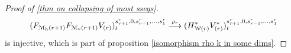 \documentclass[11pt]{amsart}
\theoremstyle{plain}
\theoremstyle{definition}
\renewcommand{\to}{\longrightarrow}
\newcommand{\calV}{\mathcal{V}}
\newcommand{\calM}{\mathcal{M}}
\newcommand{\calw}{\mathcal{W}}
\newcommand{\calMv}{\mathcal{M}_\textup{v}}
\newcommand{\calMh}{\mathcal{M}_\textup{h}}
\theoremstyle{plain}
\newcommand{\vect}[2]{\calV^{#1}_{#2}}
\newcommand{\UEAX}{\overline{X}'}%
\newcommand{\Sqh}{\mathrm{Sq}_\textup{h}}
\begin{document}
\begin{Calculations of HWn for n nonzero}
\begin{proof}[Proof of \ref{thm on collapsing of most sseqs}]
\[(F_{\calM_{\textup{h}}(r+1)}F_{\calM_{\textup{v}}(r+1)}V_{(r)})^{s_{r+1}^{r},0,s_{r-1}^{r},\ldots,s_1^{r}}_{t} \overset{\rho_r}{\to}(H^*_{\calw(r)}V^*_{(r)})^{s_{r+1}^{r},0,s_{r-1}^{r},\ldots,s_1^{r}}_{t}\]
is injective, which is part of proposition \ref{isomorphism rho k in some dims}.
%
\end{proof}

\end{Calculations of HWn for n nonzero}
\end{document}
